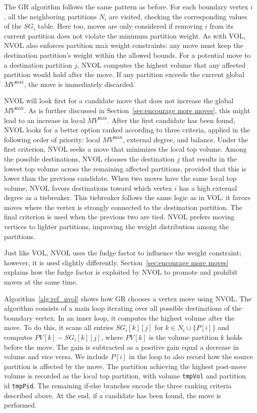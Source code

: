 The GR algorithm follows the same pattern as before. For each boundary vertex $i$, all the neighboring partitions $N_i$ are visited, checking the corresponding values of the $SG_i$ table. Here too, moves are only considered if removing $i$ from its current partition does not violate the minimum partition weight. As with VOL, NVOL also enforces partition max weight constraints: any move must keep the destination partition's weight within the allowed bounds. For a potential move to a destination partition $j$, NVOL computes the highest volume that any affected partition would hold after the move. If any partition exceeds the current global $MV^{\mathrm{max}}$, the move is immediately discarded. 

NVOL will look first for a candidate move that does not increase the global $MV^{\mathrm{max}}$. As is further discussed in Section~\ref{sec:encourage more moves}, this might lead to an increase in local $MV^{\mathrm{max}}$. After the first candidate has been found, NVOL looks for a better option ranked according to three criteria, applied in the following order of priority: local $MV^{\mathrm{max}}$, external degree, and balance. Under the first criterion, NVOL seeks a move that minimizes the local top volume. Among the possible destinations, NVOL chooses the destination $j$ that results in the lowest top volume across the remaining affected partitions, provided that this is lower than the previous candidate. When two moves have the same local top volume, NVOL favors destinations toward which vertex $i$ has a high external degree as a tiebreaker. This tiebreaker follows the same logic as in VOL: it favors moves where the vertex is strongly connected to the destination partition. The final criterion is used when the previous two are tied. NVOL prefers moving vertices to lighter partitions, improving the weight distribution among the partitions. 

Just like VOL, NVOL uses the fudge factor to influence the weight constraint; however, it is used slightly differently. Section~\ref{sec:encourage more moves} explains how the fudge factor is exploited by NVOL to promote and prohibit moves at the same time. 

Algorithm~\ref{alg:ref_nvol} shows how GR chooses a vertex move using NVOL. The algorithm consists of a main loop iterating over all possible destinations of the boundary vertex. In an inner loop, it computes the highest volume after the move. To do this, it scans all entries $SG_i[k][j]$ for $k \in N_i \cup \{P[i]\}$ and computes $PV[k] - SG_i[k][j]$, where $PV[k]$ is the volume partition $k$ holds before the move. The gain is subtracted as a positive gain equal a decrease in volume and vice versa. We include $P[i]$ in the loop to also record how the source partition is affected by the move. The partition achieving the highest post-move volume is recorded as the local top partition, with volume \texttt{tmpVol} and partition id \texttt{tmpPid}. The remaining if-else branches encode the three ranking criteria described above. At the end, if a candidate has been found, the move is performed.

